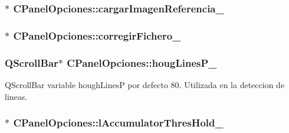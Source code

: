 \subsubsection[{\texorpdfstring{cargar\+Imagen\+Referencia\+\_\+}{cargarImagenReferencia_}}]{$\ast$ C\+Panel\+Opciones\+::cargar\+Imagen\+Referencia\+\_\+\hspace{0.3cm}{\ttfamily [private]}}\hypertarget{classCPanelOpciones_a74e3bdc7892ba6882651f31c1aea45ce}{}\label{classCPanelOpciones_a74e3bdc7892ba6882651f31c1aea45ce}
\subsubsection[{\texorpdfstring{corregir\+Fichero\+\_\+}{corregirFichero_}}]{$\ast$ C\+Panel\+Opciones\+::corregir\+Fichero\+\_\+\hspace{0.3cm}{\ttfamily [private]}}\hypertarget{classCPanelOpciones_ab80a05d83108d54639a2c053467791bf}{}\label{classCPanelOpciones_ab80a05d83108d54639a2c053467791bf}
\subsubsection[{\texorpdfstring{houg\+Lines\+P\+\_\+}{hougLinesP_}}]{\setlength{\rightskip}{0pt plus 5cm}Q\+Scroll\+Bar$\ast$ C\+Panel\+Opciones\+::houg\+Lines\+P\+\_\+\hspace{0.3cm}{\ttfamily [private]}}\hypertarget{classCPanelOpciones_a8e5bbb65d75f9dec3623b1796465c583}{}\label{classCPanelOpciones_a8e5bbb65d75f9dec3623b1796465c583}


Q\+Scroll\+Bar variable hough\+LinesP por defecto 80. Utilizada en la deteccion de lineas. 

\subsubsection[{\texorpdfstring{l\+Accumulator\+Thres\+Hold\+\_\+}{lAccumulatorThresHold_}}]{$\ast$ C\+Panel\+Opciones\+::l\+Accumulator\+Thres\+Hold\+\_\+\hspace{0.3cm}{\ttfamily [private]}}\hypertarget{classCPanelOpciones_a1f50e0020b3c6012bda44fbe27069888}{}\label{classCPanelOpciones_a1f50e0020b3c6012bda44fbe27069888}

